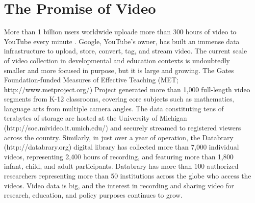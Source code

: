 \documentclass[letterpaper,man,apacite]{apa6}
\begin{document}
\section{The Promise of Video}

More than 1 billion users worldwide uploade more than 300 hours of video to YouTube every minute \cite{YouTube2015}. 
Google, YouTube's owner, has built an immense data infrastructure to upload, store, convert, tag, and stream video. 
The current scale of video collection in developmental and education contexts is undoubtedly smaller and more focused in purpose, but it is large and growing. 
The Gates Foundation-funded Measures of Effective Teaching (MET; http://www.metproject.org/) Project generated more than 1,000 full-length video segments from K-12 classrooms, covering core subjects such as mathematics, language arts from multiple camera angles. 
The data constituting tens of terabytes of storage are hosted at the University of Michigan (http://soe.mivideo.it.umich.edu/) and securely streamed to registered viewers across the country.
Similarly, in just over a year of operation, the Databrary (http://databrary.org) digital library has collected more than 7,000 individual videos, representing 2,400 hours of recording, and featuring more than 1,800 infant, child, and adult participants.
Databrary has more than 100 authorized researchers representing more than 50 institutions across the globe who access the videos.
Video data is big, and the interest in recording and sharing video for research, education, and policy purposes continues to grow.
\end{document}
